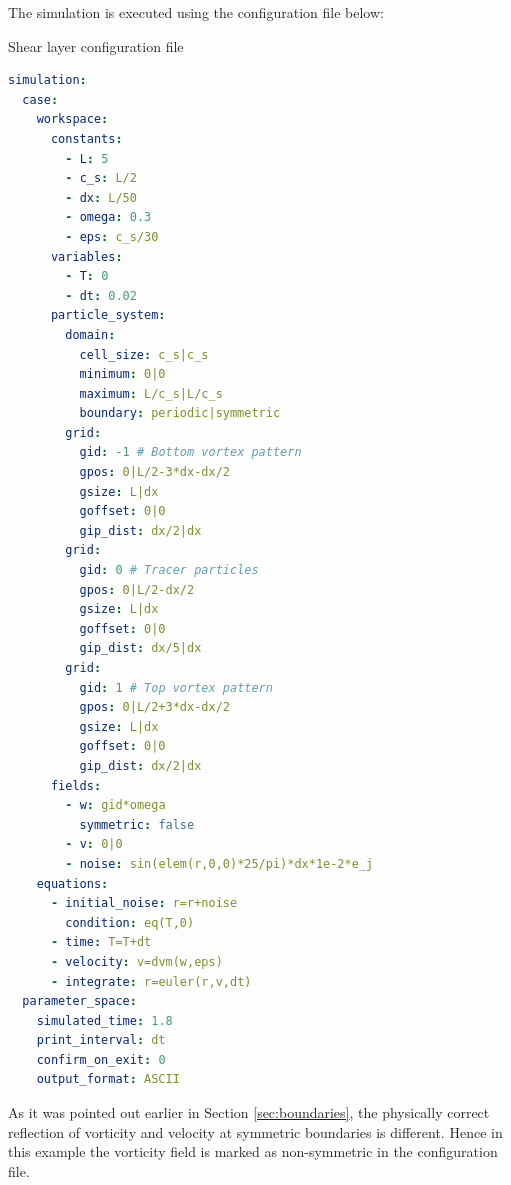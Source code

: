 \documentclass[a4paper,12pt,openany]{book}
\theoremstyle{break}
\begin{document}
The simulation is executed using the configuration file below:
\begin{samepage}
\begin{example}{Shear layer configuration file}{}
\lstset{basicstyle=\tiny}
\begin{lstlisting}[language=YAML]
simulation:
  case:
    workspace:
      constants:
        - L: 5
        - c_s: L/2
        - dx: L/50
        - omega: 0.3
        - eps: c_s/30
      variables:
        - T: 0
        - dt: 0.02
      particle_system:
        domain:
          cell_size: c_s|c_s
          minimum: 0|0
          maximum: L/c_s|L/c_s
          boundary: periodic|symmetric
        grid:
          gid: -1 # Bottom vortex pattern
          gpos: 0|L/2-3*dx-dx/2
          gsize: L|dx
          goffset: 0|0
          gip_dist: dx/2|dx
        grid:
          gid: 0 # Tracer particles
          gpos: 0|L/2-dx/2
          gsize: L|dx
          goffset: 0|0
          gip_dist: dx/5|dx
        grid:
          gid: 1 # Top vortex pattern
          gpos: 0|L/2+3*dx-dx/2
          gsize: L|dx
          goffset: 0|0
          gip_dist: dx/2|dx
      fields:
        - w: gid*omega
          symmetric: false
        - v: 0|0
        - noise: sin(elem(r,0,0)*25/pi)*dx*1e-2*e_j
    equations:
      - initial_noise: r=r+noise
        condition: eq(T,0)
      - time: T=T+dt
      - velocity: v=dvm(w,eps)
      - integrate: r=euler(r,v,dt)
  parameter_space:
    simulated_time: 1.8
    print_interval: dt
    confirm_on_exit: 0
    output_format: ASCII
\end{lstlisting}
\end{example}
\end{samepage}
As it was pointed out earlier in Section \ref{sec:boundaries}, the physically correct reflection of vorticity and velocity at symmetric boundaries is different. Hence in this example the vorticity field is marked as non-symmetric in the configuration file.
\end{document}
